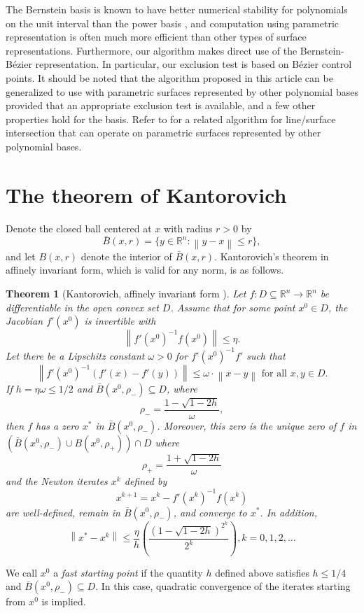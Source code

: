 \documentclass{article}
\newcommand{\norm}[1]{\left\|#1\right\|} \newcommand{\norma}[1]{\left\|#1\right\|}   \newcommand{\inv}[1]{#1^{-1}}
\newtheorem{theorem}{Theorem}[section]
\begin{document}
The Bernstein basis is known to 
have better numerical stability for polynomials on the unit interval
than the power basis \cite{farouki_rajan, farouki_stable_bernstein},  
and computation using parametric representation is often
much more efficient than other types of surface representations.  
Furthermore,
our algorithm makes direct use of the Bernstein-B\'ezier representation.
In particular, our exclusion test is based
on B\'ezier control points.  It
should be noted that the algorithm proposed in this article can be
generalized to use with parametric surfaces represented by other
polynomial bases provided that an appropriate exclusion test is
available, and a few other properties hold for the basis.  Refer to
\cite{srijuntongsiri_lsi} for a related algorithm for line/surface
intersection that can operate on parametric surfaces represented by
other polynomial bases.


\section{The theorem of Kantorovich}
\label{sec:kanto}

Denote the closed ball centered at $x$ with radius $r>0$ by
\[
\bar{B}(x,r) = \{ y \in \mathbb{R}^n : \norm{y-x} \leq r \},
\]
and let $B(x,r)$ denote the interior of $\bar{B}(x,r)$.
Kantorovich's theorem in affinely invariant form, which is valid for
any norm, is as follows.

\begin{theorem}[Kantorovich, affinely invariant form \cite{deuflhard,kantorovich}]
\label{standardkantorovich}
Let $f : D \subseteq \mathbb{R}^n \rightarrow \mathbb{R}^n$ be differentiable in
the open convex set $D$. Assume that for some point $x^0 \in D$, the Jacobian $f'(x^0)$
is invertible with
\[
\norm{f'(x^0)^{-1}f(x^0)} \leq \eta.
\]
Let there be a Lipschitz constant $\omega > 0$ for $f'(x^0)^{-1} f'$ such that
\[
\norm{f'(x^0)^{-1}(f'(x)-f'(y))} \leq \omega \cdot \norm{x-y} \textrm{ for all } x,y \in D.
\]
If $h = \eta\omega \leq 1/2$ and $\bar{B}(x^0,\rho_-) \subseteq D$, where
\[
\rho_- = \frac{1-\sqrt{1-2h}}{\omega},
\]
then $f$ has a zero $x^*$ in $\bar{B}(x^0,\rho_-)$. Moreover, this zero is the unique zero
of $f$ in $(\bar{B}(x^0,\rho_-) \cup B(x^0,\rho_+)) \cap D$ where
\[
\rho_+ = \frac{1+\sqrt{1-2h}}{\omega}
\]
and the Newton iterates $x^k$ defined by
\[
x^{k+1} = x^k - f'(x^k)^{-1}f(x^k)
\]
are well-defined, remain in $\bar{B}(x^0,\rho_-)$, and converge to $x^*$. In addition,
\[
\norm{x^*-x^k} \leq \frac{\eta}{h}\left( \frac{(1-\sqrt{1-2h})^{2^k}}{2^k} \right), k = 0,1,2,\ldots
\]
\end{theorem}
We call $x^0$ a \emph{fast starting point} if the quantity $h$
defined above satisfies $h \leq 1/4$ and $\bar{B}(x^0,\rho_-)
\subseteq D$.  In this case, quadratic convergence of the iterates
starting from $x^0$ is implied.
\end{document}

